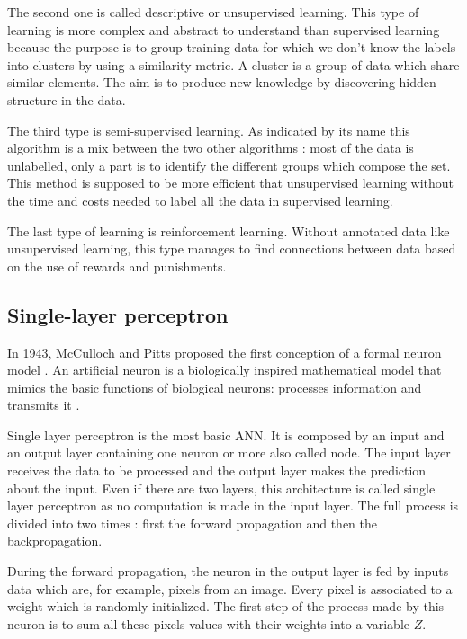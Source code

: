 The second one is called descriptive or unsupervised learning. This type of learning is more complex and abstract to understand than supervised learning because the purpose is to group training data for which we don't know the labels into clusters by using a similarity metric. 
A cluster is a group of data which share similar elements.
The aim is to produce new knowledge by discovering hidden structure in the data.

The third type is semi-supervised learning. As indicated by its name this algorithm is a mix between the two other algorithms : most of the data is unlabelled, only a part is to identify the different groups which compose the set. This method is supposed to be more efficient that unsupervised learning without the time and costs needed to label all the data in supervised learning.

The last type of learning is reinforcement learning. Without annotated data like unsupervised learning, this type manages to find connections between data based on the use of rewards and punishments.



\subsection{Single-layer perceptron}

In 1943, McCulloch and Pitts proposed the first conception of a formal neuron model \cite{mcculloch}. An artificial neuron is a biologically inspired mathematical model that mimics the basic functions of biological neurons: processes information and transmits it \cite{neuron}. 

Single layer perceptron is the most basic ANN. It is composed by an input and an output layer containing one neuron or more also called node. The input layer receives the data to be processed and the output layer makes the prediction about the input. Even if there are two layers, this architecture is called single layer perceptron as no computation is made in the input layer. The full process is divided into two times : first the forward propagation and then the backpropagation. 

During the forward propagation, the neuron in the output layer is fed by inputs data which are, for example, pixels from an image. Every pixel is associated to a weight which is randomly initialized. 
The first step of the process made by this neuron is to sum all these pixels values with their weights into a variable $Z$.

